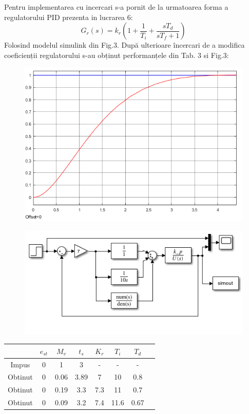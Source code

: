 \documentclass[11pt]{article}
\newcommand{\EqRow}{\vspace{1.5mm}}
\begin{document}
Pentru implementarea cu incercari s-a pornit de la urmatoarea forma a regulatorului PID prezenta in lucrarea 6:
\begin{equation} 
G_r(s)=k_r(1+\frac{1}{T_i}+\frac{sT_d}{sT_f+1})
\end{equation}
Folosind modelul simulink din Fig.3.
După ulterioare încercari de a modifica coeficienții regulatorului s-au obținut performanțele din Tab. 3 si Fig.3:
\EqRow
\begin{figure}[H]
	\centering
	\begin{minipage}{.4\textwidth}
		\centering
		\includegraphics[width=.9\linewidth]{incercari.png}
		\label{fig:test2}
	\end{minipage}
	\begin{minipage}{.5\textwidth}
		\centering
		\includegraphics[width=1\linewidth]{sim_incercari.png}
		\label{fig:test2}
	\end{minipage}
\end{figure}
\begin{center}
	\begin{tabular}{|c|c|c|c|c|c|c|c|}
		\hline
		&$e_{st}$&$M_v$&$t_s$&$K_r$&$T_i$&$T_d$\\
		\hline
		Impus&0&1&3&-&-&-\\
		\hline
		Obtinut&0&0.06&3.89&7&10&0.8\\
		Obtinut&0&0.19&3.3&7.3&11&0.7\\
		Obtinut&0&0.09&3.2&7.4&11.6&0.67\\
		\hline
	\end{tabular}
\end{center}
\newpage
\end{document}

